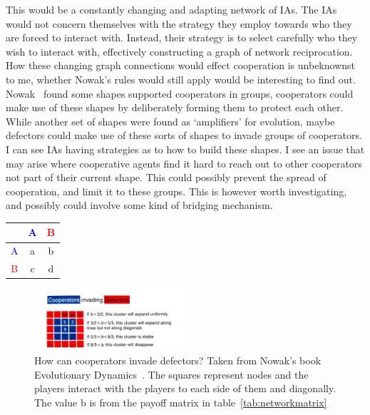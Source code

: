 \documentclass[]{final_report}
\begin{document}
This would be a constantly changing and adapting network of IAs. The IAs would not concern themselves with the strategy they employ towards who they are forced to interact with. Instead, their strategy is to select carefully who they wish to interact with, effectively constructing a graph of network reciprocation. How these changing graph connections would effect cooperation is unbeknownst to me, whether Nowak's rules would still apply would be interesting to find out.\\
Nowak~\cite{nowak2006evolutionary} found some shapes supported cooperators in groups, cooperators could make use of these shapes by deliberately forming them to protect each other. While another set of shapes were found as `amplifiers' for evolution, maybe defectors could make use of these sorts of shapes to invade groups of cooperators.\\
I can see IAs having strategies as to how to build these shapes. I see an issue that may arise where cooperative agents find it hard to reach out to other cooperators not part of their current shape. This could possibly prevent the spread of cooperation, and limit it to these groups. This is however worth investigating, and possibly could involve some kind of bridging mechanism.
\begin{framed}
	\begin{center}
		\begin{tabular}{c|cc}
		& \textcolor{blue}{A} & \textcolor{red}{B}\\		
		\hline
		\textcolor{blue}{A} & a & b\\
		\textcolor{red}{B} & c & d\\
		\end{tabular}
		\label{tab:networkmatrix}
	\end{center}	
\end{framed}
\begin{figure}
	\center
	\includegraphics[width=0.5\textwidth]{cooperators-invading-defectors.jpg}
	\caption{How can cooperators invade defectors? Taken from Nowak's book Evolutionary Dynamics~\cite{nowak2006evolutionary}. The squares represent nodes and the players interact with the players to each side of them and diagonally. The value b is from the payoff matrix in table~\ref{tab:networkmatrix}}
	\label{fig:coopinvdef}
\end{figure}
\end{document}
